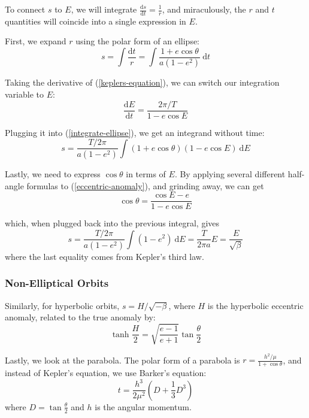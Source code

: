 \documentclass{article}
\newcommand{\dd}{\mathrm{d}}
\newcommand{\der}[2]{\frac{\dd #1}{\dd #2}}
\numberwithin{equation}{subsection}
\begin{document}
To connect $s$ to $E$, we will integrate $\der{s}{t} = \frac{1}{r}$, and miraculously, the $r$ and $t$ quantities will coincide into a single expression in $E$.

First, we expand $r$ using the polar form of an ellipse:
\begin{equation}
\label{integrate-ellipse}
s = \int \frac{\dd t}{r} = \int \frac{1 + e \cos \theta}{a (1-e^2)}~\dd t
\end{equation}

Taking the derivative of (\ref{keplers-equation}), we can switch our integration variable to $E$:
\begin{equation}
\der{E}{t} = \frac{2 \pi / T}{1 - e \cos E}
\end{equation}

Plugging it into (\ref{integrate-ellipse}), we get an integrand without time:
\begin{equation}
s = \frac{T / 2 \pi}{a (1-e^2)} \int (1 + e \cos \theta)(1 - e \cos E)~\dd E
\end{equation}

Lastly, we need to express $\cos \theta$ in terms of $E$. By applying several different half-angle formulas to (\ref{eccentric-anomaly}), and grinding away, we can get
\begin{equation}
\cos \theta = \frac{\cos E - e}{1 - e \cos E}
\end{equation}

which, when plugged back into the previous integral, gives
\begin{equation}
s = \frac{T / 2 \pi}{a(1 - e^2)} \int (1 - e^2)~\dd E = \frac{T}{2 \pi a} E = \frac{E}{\sqrt \beta}
\end{equation}
where the last equality comes from Kepler's third law.

\subsubsection*{Non-Elliptical Orbits}

Similarly, for hyperbolic orbits, $s = H/\sqrt{-\beta}$, where $H$ is the hyperbolic eccentric anomaly, related to the true anomaly by:
\begin{equation}
\label{hyperbolic-anomaly}
\tanh{\frac{H}{2}} = \sqrt{\frac{e-1}{e+1}} \tan{\frac{\theta}{2}}
\end{equation}

Lastly, we look at the parabola. The polar form of a parabola is $r = \frac{h^2/\mu}{1 + \cos \theta}$, and instead of Kepler's equation, we use Barker's equation:
\begin{equation}
\label{barker}
t = \frac{h^3}{2 \mu^2} (D + \frac{1}{3} D^3)
\end{equation}
where $D = \tan \frac{\theta}{2}$ and $h$ is the angular momentum.
\end{document}
